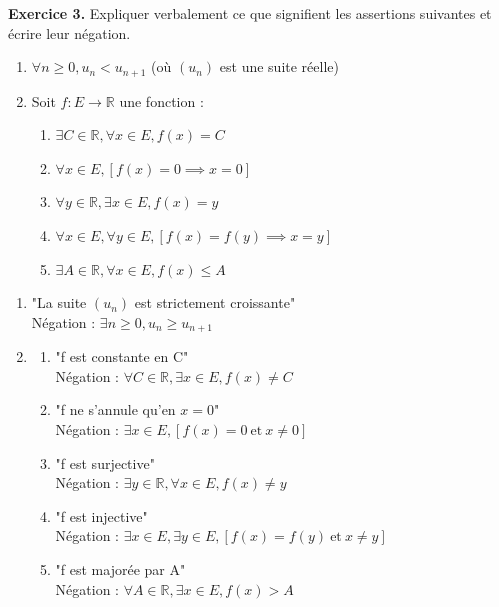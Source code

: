 \documentclass[a4paper, 10pt]{report}
\begin{document}
	\newpage
	
	\fancyhf{}
	\renewcommand{\headrule}
	{\rule{\textwidth}{0pt}}
	
	\noindent
	\textbf{Exercice 3.} Expliquer verbalement ce que signifient les
	assertions suivantes et écrire leur négation.
	
	\begin{enumerate}[label=(\roman*)]
		\item $\forall n \geq 0, u_n < u_{n+1}$
		(où $(u_n)$ est une suite réelle)
		\item Soit $f : E \to \mathbb{R}$ une fonction :
		\begin{enumerate}[label=(\alph*)]
			\item $\exists C \in \mathbb{R},
				\forall x \in E,
				f(x) = C$
			\item $\forall x \in E,
				[f(x) = 0 \implies x = 0]$
			\item $\forall y \in \mathbb{R},
				\exists x \in E,
				f(x) = y$
			\item $\forall x \in E,
				\forall y \in E,
				[f(x) = f(y) \implies x = y]$
			\item $\exists A \in \mathbb{R},
				\forall x \in E,
				f(x) \leq A$
		\end{enumerate}
	\end{enumerate}
	
	\colorbox{solution}
	{
		\begin{minipage}{0.9\textwidth}
			\begin{enumerate}[label=(\roman*)]
				\item "La suite $(u_n)$ est strictement croissante"\\
				Négation : $\exists n \geq 0, u_n \geq u_{n+1}$
				\item \begin{enumerate}[label=(\alph*)]
					\item "f est constante en C"\\
					Négation : $\forall C \in \mathbb{R},
						\exists x \in E,
						f(x) \neq C$
					\item "f ne s'annule qu'en $x = 0$"\\
					Négation : $\exists x \in E,
						[f(x) = 0 \ \text{et}\ x \neq 0]$
					\item "f est surjective"\\
					Négation : $\exists y \in \mathbb{R},
						\forall x \in E,
						f(x) \neq y$
					\item "f est injective"\\
					Négation :  $\exists x \in E,
						\exists y \in E,
						[f(x) = f(y) \ \text{et}\ x \neq y]$
					\item "f est majorée par A"\\
					Négation : $\forall A \in \mathbb{R},
						\exists x \in E,
						f(x) > A$
				\end{enumerate}
			\end{enumerate}
		\end{minipage}
	}
	
\end{document}
